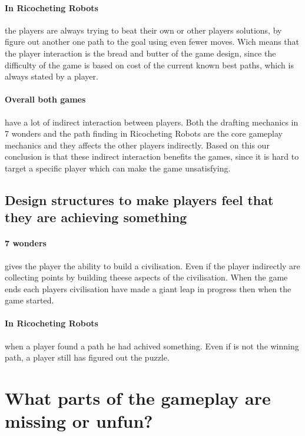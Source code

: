 \documentclass[a4paper]{article}
\begin{document}
\paragraph{In Ricocheting Robots} the players are always trying to beat their own or other players solutions, by figure out another one path to the goal using even fewer moves. Wich means that the player interaction is the bread and butter of the game design, since the difficulty of the game is based on cost of the current known best paths, which is always stated by a player.

\paragraph{Overall both games} have a lot of indirect interaction between players. Both the drafting mechanics in 7 wonders and the path finding in Ricocheting Robots are the core gameplay mechanics and they affects the other players indirectly. Based on this our conclusion is that these indirect interaction benefits the games, since it is hard to target a specific player which can make the game unsatisfying.

\subsection{Design structures to make players feel that they are achieving something}
\paragraph{7 wonders} gives the player the ability to build a civilisation. Even if the player indirectly are collecting points by building theese aspects of the civilisation. When the game ends each players civilisation have made a giant leap in progress then when the game started.

\paragraph{In Ricocheting Robots} when a player found a path he had achived something. Even if is not the winning path, a player still has figured out the puzzle.

\section{What parts of the gameplay are missing or unfun?}


\newpage


\end{document}
